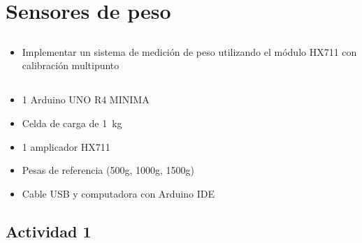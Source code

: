 \chapter{Sensores de peso}
\section{\obj}
\capacidad
\begin{itemize}
\item Implementar un sistema de medición de peso utilizando el módulo HX711 con calibración multipunto
\end{itemize}

\section{\mat}
\begin{itemize}
\item 1 Arduino UNO R4 MINIMA
\item Celda de carga de \SI{1}{\kilogram}
\item 1 amplicador HX711
\item Pesas de referencia (500g, 1000g, 1500g)
\item Cable USB y computadora con Arduino IDE
\end{itemize}

\section{Actividad 1}
